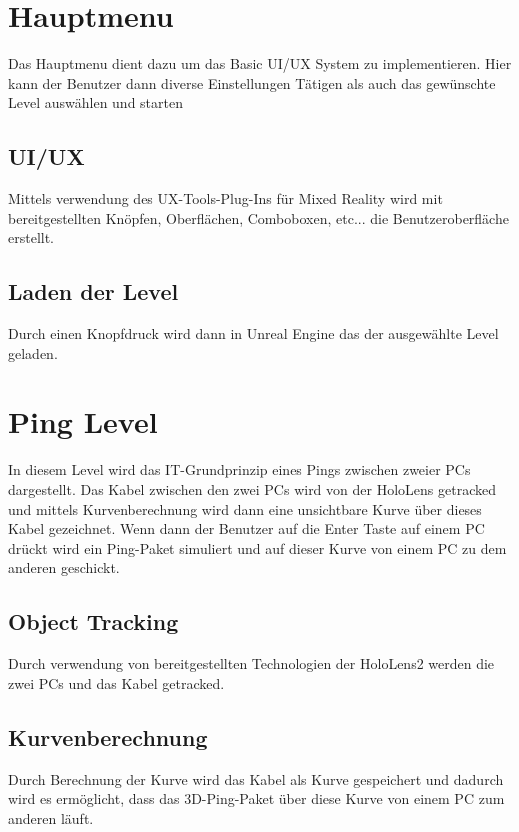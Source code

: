 \section{Hauptmenu}
Das Hauptmenu dient dazu um das Basic UI/UX System zu implementieren.
Hier kann der Benutzer dann diverse Einstellungen Tätigen als auch
das gewünschte Level auswählen und starten

\subsection{UI/UX}
Mittels verwendung des UX-Tools-Plug-Ins für Mixed Reality wird
mit bereitgestellten Knöpfen, Oberflächen, Comboboxen, etc...
die Benutzeroberfläche erstellt.

\subsection{Laden der Level}
Durch einen Knopfdruck wird dann in Unreal Engine das der ausgewählte
Level geladen.

\section{Ping Level}
In diesem Level wird das IT-Grundprinzip eines Pings zwischen zweier
PCs dargestellt. Das Kabel zwischen den zwei PCs wird von der
HoloLens getracked und mittels Kurvenberechnung wird dann eine
unsichtbare Kurve über dieses Kabel gezeichnet. Wenn dann der Benutzer
auf die Enter Taste auf einem PC drückt wird ein Ping-Paket simuliert
und auf dieser Kurve von einem PC zu dem anderen geschickt.

\subsection{Object Tracking}
Durch verwendung von bereitgestellten Technologien der HoloLens2
werden die zwei PCs und das Kabel getracked.

\subsection{Kurvenberechnung}
Durch Berechnung der Kurve wird das Kabel als Kurve gespeichert
und dadurch wird es ermöglicht, dass das 3D-Ping-Paket über diese
Kurve von einem PC zum anderen läuft.

